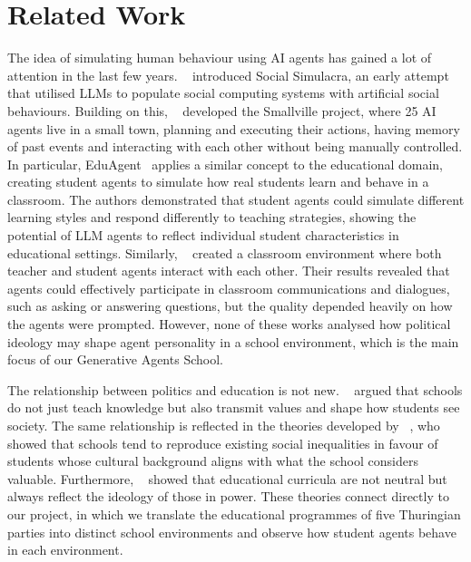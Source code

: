\chapter{Related Work} 
\label{relatedWork}

The idea of simulating human behaviour using AI agents has gained a lot of attention in the last few years. \citeauthor{park:2022}~\cite{park:2022} introduced Social Simulacra, an early attempt that utilised LLMs to populate social computing systems with artificial social behaviours. Building on this, \citeauthor{park:2023}~\cite{park:2023} developed the Smallville project, where 25 AI agents live in a small town, planning and executing their actions, having memory of past events and interacting with each other without being manually controlled. In particular, EduAgent~\cite{xu:2024} applies a similar concept to the educational domain, creating student agents to simulate how real students learn and behave in a classroom. The authors demonstrated that student agents could simulate different learning styles and respond differently to teaching strategies, showing the potential of LLM agents to reflect individual student characteristics in educational settings. Similarly, \citeauthor{zhang:2025}~\cite{zhang:2025} created a classroom environment where both teacher and student agents interact with each other. Their results revealed that agents could effectively participate in classroom communications and dialogues, such as asking or answering questions, but the quality depended heavily on how the agents were prompted. However, none of these works analysed how political ideology may shape agent personality in a school environment, which is the main focus of our Generative Agents School.

The relationship between politics and education is not new. \citeauthor{dewey:1916}~\cite{dewey:1916} argued that schools do not just teach knowledge but also transmit values and shape how students see society. The same relationship is reflected in the theories developed by \citeauthor{bourdieu:1970}~\cite{bourdieu:1970}, who showed that schools tend to reproduce existing social inequalities in favour of students whose cultural background aligns with what the school considers valuable. Furthermore, \citeauthor{apple:2004}~\cite{apple:2004} showed that educational curricula are not neutral but always reflect the ideology of those in power. These theories connect directly to our project, in which we translate the educational programmes of five Thuringian parties into distinct school environments and observe how student agents behave in each environment.

